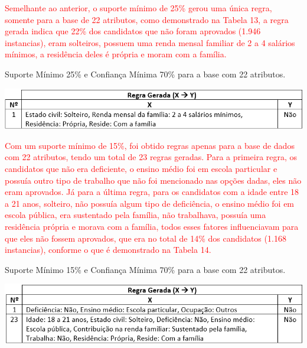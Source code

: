 \par
\textcolor{red}{Semelhante ao anterior, o suporte mínimo de 25\% gerou uma única regra, somente para a base de 22 atributos, como demonstrado na Tabela 13, a regra gerada indica que 22\% dos candidatos que não foram aprovados (1.946 instancias), eram solteiros, possuem uma renda mensal familiar de 2 a 4 salários mínimos, a residência deles é própria e moram com a família.}

\par
\begin{table}[!htp]
	\begin{center}
    \caption{\label{fig:waveform_fig} Suporte Mínimo 25\% e Confiança Mínima 70\% para a base com 22 atributos.}
	\includegraphics[scale=0.75]{Figuras/Suporte_25_Nao_atributos_22.png}
	\end{center}
\end{table}

\par
\textcolor{red}{Com um suporte mínimo de 15\%, foi obtido regras apenas para a base de dados com 22 atributos, tendo um total de 23 regras geradas. Para a primeira regra, os candidatos que não era deficiente, o ensino médio foi em escola particular e possuía outro tipo de trabalho que não foi mencionado nas opções dadas, eles não eram aprovados. Já para a última regra, para os candidatos com a idade entre 18 a 21 anos, solteiro, não possuía algum tipo de deficiência, o ensino médio foi em escola pública, era sustentado pela família, não trabalhava, possuía uma residência própria e morava com a família, todos esses fatores influenciavam para que eles não fossem aprovados, que era no total de 14\% dos candidatos (1.168 instancias), conforme o que é demonstrado na Tabela 14.}

\par
\begin{table}[!htp]
	\begin{center}
    \caption{\label{fig:waveform_fig} Suporte Mínimo 15\% e Confiança Mínima 70\% para a base com 22 atributos.}
	\includegraphics[scale=0.75]{Figuras/Suporte_15_Nao_atributos_22.png}
	\end{center}
\end{table}


